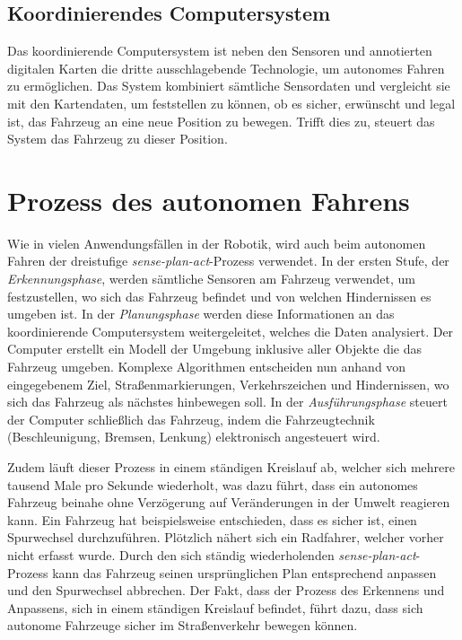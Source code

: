 \subsection{Koordinierendes Computersystem}

Das koordinierende Computersystem ist neben den Sensoren und annotierten digitalen Karten die dritte ausschlagebende Technologie, um autonomes Fahren zu ermöglichen. Das System kombiniert sämtliche Sensordaten und vergleicht sie mit den Kartendaten, um feststellen zu können, ob es sicher, erwünscht und legal ist, das Fahrzeug an eine neue Position zu bewegen. Trifft dies zu, steuert das System das Fahrzeug zu dieser Position.


\section{Prozess des autonomen Fahrens}

Wie in vielen Anwendungsfällen in der Robotik, wird auch beim autonomen Fahren der dreistufige \textit{sense-plan-act}-Prozess verwendet.  In der ersten Stufe, der \textit{Erkennungsphase}, werden sämtliche Sensoren am Fahrzeug verwendet, um festzustellen, wo sich das Fahrzeug befindet und von welchen Hindernissen es umgeben ist. In der \textit{Planungsphase} werden diese Informationen an das koordinierende Computersystem weitergeleitet, welches die Daten analysiert. Der Computer erstellt ein Modell der Umgebung inklusive aller Objekte die das Fahrzeug umgeben. Komplexe Algorithmen entscheiden nun anhand von eingegebenem Ziel, Straßenmarkierungen, Verkehrszeichen und Hindernissen, wo sich das Fahrzeug als nächstes hinbewegen soll. In der \textit{Ausführungsphase} steuert der Computer schließlich das Fahrzeug, indem die Fahrzeugtechnik (Beschleunigung, Bremsen, Lenkung) elektronisch angesteuert wird.

Zudem läuft dieser Prozess in einem ständigen Kreislauf ab, welcher sich mehrere tausend Male pro Sekunde wiederholt, was dazu führt, dass ein autonomes Fahrzeug beinahe ohne Verzögerung auf Veränderungen in der Umwelt reagieren kann. Ein Fahrzeug hat beispielsweise entschieden, dass es sicher ist, einen Spurwechsel durchzuführen. Plötzlich nähert sich ein Radfahrer, welcher vorher nicht erfasst wurde. Durch den sich ständig wiederholenden \textit{sense-plan-act}-Prozess kann das Fahrzeug seinen ursprünglichen Plan entsprechend anpassen und den Spurwechsel abbrechen. Der Fakt, dass der Prozess des Erkennens und Anpassens, sich in einem ständigen Kreislauf befindet, führt dazu, dass sich autonome Fahrzeuge sicher im Straßenverkehr bewegen können.
